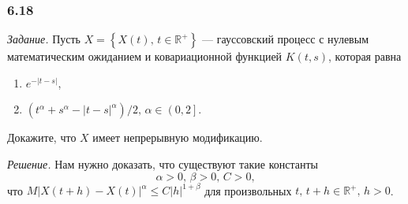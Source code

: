 \subsubsection*{6.18}

\textit{Задание.}
Пусть $X = \left\{ X \left( t \right), \, t \in \mathbb{R}^+ \right\} $ ---
гауссовский процесс с нулевым математическим ожиданием и ковариационной функцией
$K \left( t, s \right) $, которая равна
\begin{enumerate}[label=\alph*)]
  \item $e^{-\left| t - s \right| }$,
  \item $ \left( t^{ \alpha } + s^{ \alpha } - \left| t - s \right|^{ \alpha } \right) / 2, \,
    \alpha \in \left( 0, 2 \right] $.
\end{enumerate}
Докажите, что $X$ имеет непрерывную модификацию.

\textit{Решение.}
Нам нужно доказать, что существуют такие константы
$$ \alpha > 0, \,
  \beta > 0, \,
  C > 0,$$
что
$M \left| X \left( t + h \right) - X \left( t \right) \right|^{ \alpha} \leq
  C \left| h \right|^{1 + \beta }$
для произвольных $t, \, t + h \in \mathbb{R}^+, \, h > 0$.

